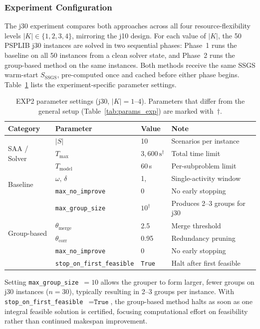 \subsubsection*{Experiment Configuration}
The j30 experiment compares both approaches across all four
resource-flexibility levels $|K| \in \{1,2,3,4\}$, mirroring
the j10 design. For each value of $|K|$, the 50 PSPLIB j30
instances are
solved in two sequential phases: Phase~1 runs the baseline on
all 50 instances from a clean solver state, and Phase~2 runs the
group-based method on the same instances. Both methods receive
the same SSGS warm-start $S_{\mathrm{SSGS}}$, pre-computed once
and cached before either phase begins.
Table~\ref{tab:exp2_params} lists the experiment-specific
parameter settings.
\begin{table}[ht]
\centering
\renewcommand{\arraystretch}{1.35}
\caption{EXP2 parameter settings (j30, $|K|=1\text{--}4$).
         Parameters that differ from the general setup
         (Table~\ref{tab:params_exp}) are marked with~$\dagger$.}
\label{tab:exp2_params}
\begin{tabular}{llll}
\hline
\textbf{Category} & \textbf{Parameter} & \textbf{Value} & \textbf{Note} \\
\hline
\multirow{3}{*}{SAA / Solver}
    & $|S|$                               & 10                    & Scenarios per instance \\
    & $T_{\max}$                          & $3{,}600\,\text{s}^\dagger$ & Total time limit \\
    & $T_{\mathrm{model}}$                & 60\,s                 & Per-subproblem limit \\
\hline
\multirow{2}{*}{Baseline}
    & $\omega,\,\delta$                   & 1,\;0                 & Single-activity window \\
    & \texttt{max\_no\_improve}           & 0                     & No early stopping \\
\hline
\multirow{5}{*}{Group-based}
    & \texttt{max\_group\_size}           & $10^\dagger$          & Produces 2--3 groups for j30 \\
    & $\theta_{\mathrm{merge}}$           & 2.5                   & Merge threshold \\
    & $\theta_{\mathrm{corr}}$            & 0.95                  & Redundancy pruning \\
    & \texttt{max\_no\_improve}           & 0                     & No early stopping \\
    & \texttt{stop\_on\_first\_feasible}  & \texttt{True}         & Halt after first feasible \\
\hline
\end{tabular}
\end{table}
\noindent
Setting \texttt{max\_group\_size}~$=10$ allows the grouper to
form larger, fewer groups on j30 instances ($n=30$), typically
resulting in 2--3 groups per instance. With
\texttt{stop\_on\_first\_feasible}~$=\texttt{True}$, the
group-based method halts as soon as one integral feasible
solution is certified, focusing computational effort on
feasibility rather than continued makespan improvement.
